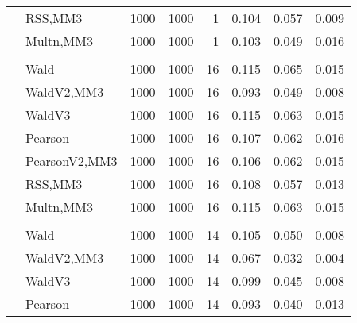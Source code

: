 \documentclass[
]{article}
\begin{document}
\begin{table}[H]
{\begin{tabular}[t]{llrrrrrr}
\hspace{1em} & RSS,MM3 & 1000 & 1000 & 1 & 0.104 & 0.057 & 0.009\\

\hspace{1em} & Multn,MM3 & 1000 & 1000 & 1 & 0.103 & 0.049 & 0.016\\
\cmidrule{1-8}
\addlinespace[0.3em]
\multicolumn{8}{l}{\textbf{1F 15V}}\\
\hspace{1em} & Wald & 1000 & 1000 & 16 & 0.115 & 0.065 & 0.015\\

\hspace{1em} & WaldV2,MM3 & 1000 & 1000 & 16 & 0.093 & 0.049 & 0.008\\

\hspace{1em} & WaldV3 & 1000 & 1000 & 16 & 0.115 & 0.063 & 0.015\\

\hspace{1em} & Pearson & 1000 & 1000 & 16 & 0.107 & 0.062 & 0.016\\

\hspace{1em} & PearsonV2,MM3 & 1000 & 1000 & 16 & 0.106 & 0.062 & 0.015\\

\hspace{1em} & RSS,MM3 & 1000 & 1000 & 16 & 0.108 & 0.057 & 0.013\\

\hspace{1em} & Multn,MM3 & 1000 & 1000 & 16 & 0.115 & 0.063 & 0.015\\
\cmidrule{1-8}
\addlinespace[0.3em]
\multicolumn{8}{l}{\textbf{2F 10V}}\\
\hspace{1em} & Wald & 1000 & 1000 & 14 & 0.105 & 0.050 & 0.008\\

\hspace{1em} & WaldV2,MM3 & 1000 & 1000 & 14 & 0.067 & 0.032 & 0.004\\

\hspace{1em} & WaldV3 & 1000 & 1000 & 14 & 0.099 & 0.045 & 0.008\\

\hspace{1em} & Pearson & 1000 & 1000 & 14 & 0.093 & 0.040 & 0.013\\


\end{tabular}}
\end{table}
\end{document}
